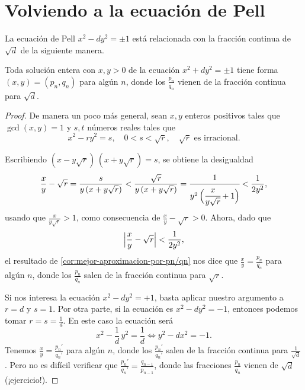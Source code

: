 
\section{Volviendo a la ecuación de Pell}

La ecuación de Pell $x^2 - dy^2 = \pm 1$ está relacionada con la fracción
continua de $\sqrt{d}$ de la siguiente manera.

\begin{proposicion}
  Toda solución entera con $x,y > 0$ de la ecuación $x^2 + dy^2 = \pm 1$ tiene
  forma $(x,y) = (p_n,q_n)$ para algún $n$, donde los $\frac{p_n}{q_n}$ vienen
  de la fracción continua para $\sqrt{d}$.

  \begin{proof}
    De manera un poco más general, sean $x,y$ enteros positivos tales que
    $\gcd (x,y) = 1$ y $s,t$ números reales tales que
    \[ x^2 - ry^2 = s, \quad
       0 < s < \sqrt{r}, \quad
       \sqrt{r}\text{ es irracional}. \]

    Escribiendo $(x - y\sqrt{r})\,(x + y\sqrt{r}) = s$, se obtiene
    la desigualdad
    \[ \frac{x}{y} - \sqrt{r} = \frac{s}{y\,(x + y\sqrt{r})} <
    \frac{\sqrt{r}}{y\,(x + y\sqrt{r})} =
    \cfrac{1}{y^2\,\Bigl(\cfrac{x}{y\sqrt{r}} + 1\Bigr)} <
    \frac{1}{2y^2}, \]
    usando que $\frac{x}{y\sqrt{r}} > 1$, como consecuencia de
    $\frac{x}{y} - \sqrt{r} > 0$. Ahora, dado que
    $$\Bigl|\frac{x}{y} - \sqrt{r}\Bigr| < \frac{1}{2y^2},$$
    el resultado de \ref{cor:mejor-aproximacion-por-pn/qn} nos dice que
    $\frac{x}{y} = \frac{p_n}{q_n}$ para algún $n$, donde los $\frac{p_n}{q_n}$
    salen de la fracción continua para $\sqrt{r}$.

    Si nos interesa la ecuación $x^2 - dy^2 = +1$, basta aplicar nuestro
    argumento a $r = d$ y $s = 1$. Por otra parte, si la ecuación es
    $x^2 - dy^2 = -1$, entonces podemos tomar $r = s = \frac{1}{d}$. En este
    caso la ecuación será
    $$x^2 - \frac{1}{d}\,y^2 = \frac{1}{d} \iff y^2 - dx^2 = -1.$$
    Tenemos $\frac{x}{y} = \frac{p_n'}{q_n'}$ para algún $n$, donde los
    $\frac{p_n'}{q_n'}$ salen de la fracción continua para $\frac{1}{\sqrt{d}}$.
    Pero no es difícil verificar que
    $\frac{p_n'}{q_n'} = \frac{q_{n-1}}{p_{n-1}}$, donde las fracciones
    $\frac{p_n}{q_n}$ vienen de $\sqrt{d}$ (¡ejercicio!).
  \end{proof}
\end{proposicion}

